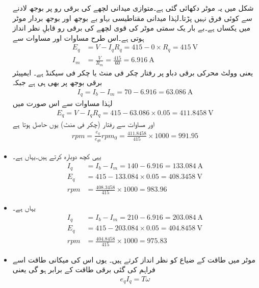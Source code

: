 \begin{itemize}
شکل  میں یہ موٹر دکھائی گئی ہے۔متوازی میدانی لچھے کی برقی رو پر بوجھ لادنے سے کوئی فرق نہیں پڑتا۔لہٰذا میدانی مقناطیسی بہاو بے بوجھ اور بوجھ بردار موٹر میں یکساں ہے۔بے بار یک سمتی موٹر کی قوی لچھے کی برقی رو   قابلِ نظر انداز ہوتی ہے۔اس طرح مساوات   اور مساوات   سے  
\begin{align*}
E_q&=V-I_q R_q=415-0\times R_q=\SI{415}{\volt}\\
I_m&=\frac{V}{R_m}=\frac{415}{60}=\SI{6.916}{\ampere}
\end{align*}
یعنی  وولٹ محرکی برقی دباو پر رفتار  چکر فی منٹ یا  چکر فی سیکنڈ ہے۔ ایمپیئر برقی بوجھ پر بھی  ہی ہے جبکہ 
\begin{align*}
I_q=I_b-I_m=70-6.916=\SI{63.086}{\ampere}
\end{align*}
لہٰذا مساوات   سے اس صورت میں
\begin{align*}
E_q=V-I_q R_q=415-63.086 \times 0.05=\SI{411.8458}{\volt}
\end{align*}
اور مساوات   سے رفتار (چکر فی منٹ) یوں حاصل ہوتا ہے
\begin{align*}
rpm=\frac{e_q}{e_{q0}} rpm_0=\frac{411.8458}{415} \times 1000=991.95
\end{align*}
%
\item
یہی کچھ دوبارہ کرتے ہیں۔یہاں  ہے۔
\begin{align*}
I_q&=I_b-I_m=140-6.916=\SI{133.084}{\ampere}\\
E_q&=415-133.084 \times 0.05=\SI{408.3458}{\volt}\\
rpm&=\frac{408.3458}{415} \times 1000=983.96
\end{align*}
%
\item
یہاں  ہے۔
\begin{align*}
I_q&=I_b-I_m=210-6.916=\SI{203.084}{\ampere}\\
E_q&=415-203.084 \times 0.05=\SI{404.8458}{\volt}\\
rpm&=\frac{404.8458}{415} \times 1000=975.83
\end{align*}
%
\item
موٹر میں طاقت کے ضیاع کو نظر انداز کرتے ہیں۔ یوں اس کی میکانی طاقت اسے فراہم کی گئی برقی طاقت کے برابر ہو گی یعنی
\begin{align}
e_q I_q=T \omega
\end{align}

\end{itemize}
